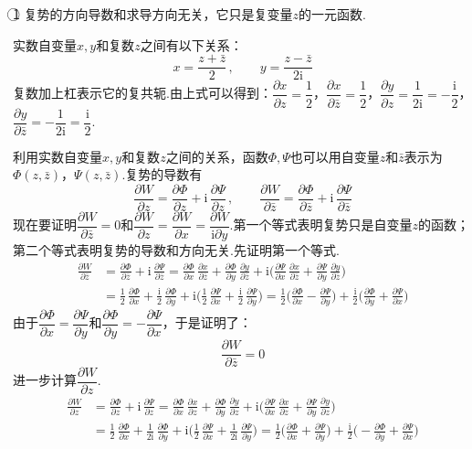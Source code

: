 \textcircled{1} 复势的方向导数和求导方向无关，它只是复变量$z$的一元函数.

实数自变量$x,y$和复数$z$之间有以下关系：
\[
x=\frac{z+\bar{z}}{2}\,,\qquad y=\frac{z-\bar{z}}{2\mathrm{i}}
\]
复数加上杠表示它的复共轭.由上式可以得到：$\dfrac{\partial x}{\partial z}=\dfrac{1}{2}$，$\dfrac{\partial x}{\partial\bar{z}}=\dfrac{1}{2}$，$\dfrac{\partial y}{\partial z}=\dfrac{1}{2\mathrm{i}}=-\dfrac{\mathrm{i}}{2}$，$\dfrac{\partial y}{\partial\bar{z}}=-\dfrac{1}{2\mathrm{i}}=\dfrac{\mathrm{i}}{2}$.

利用实数自变量$x,y$和复数$z$之间的关系，函数$\Phi,\Psi$也可以用自变量$z$和$\bar{z}$表示为$\Phi(z,\bar{z})$，$\Psi(z,\bar{z})$.复势的导数有
\[
\frac{\partial W}{\partial z}=\frac{\partial\Phi}{\partial z}+\mathrm{i}\,\frac{\partial\Psi}{\partial z}\,,\qquad \frac{\partial W}{\partial\bar{z}}=\frac{\partial\Phi}{\partial\bar{z}}+\mathrm{i}\,\frac{\partial\Psi}{\partial\bar{z}}
\]
现在要证明$\dfrac{\partial W}{\partial\bar{z}}=0$和$\dfrac{\partial W}{\partial z}=\dfrac{\partial W}{\partial x}=\dfrac{\partial W}{\mathrm{i}\partial y}$.第一个等式表明复势只是自变量$z$的函数；第二个等式表明复势的导数和方向无关.先证明第一个等式.
\begin{align*}
\frac{\partial W}{\partial\bar{z}}&=\frac{\partial\Phi}{\partial\bar{z}}+\mathrm{i}\,\frac{\partial\Psi}{\partial\bar{z}}=\frac{\partial\Phi}{\partial x}\,\frac{\partial x}{\partial\bar{z}}+\frac{\partial\Phi}{\partial y}\,\frac{\partial y}{\partial\bar{z}}+\mathrm{i}\Big(\frac{\partial\Psi}{\partial x}\,\frac{\partial x}{\partial\bar{z}}+\frac{\partial\Psi}{\partial y}\,\frac{\partial y}{\partial\bar{z}}\Big)\\
&=\frac{1}{2}\,\frac{\partial\Phi}{\partial x}+\frac{\mathrm{i}}{2}\,\frac{\partial\Phi}{\partial y}+\mathrm{i}\Big(\frac{1}{2}\,\frac{\partial\Psi}{\partial x}+\frac{\mathrm{i}}{2}\,\frac{\partial\Psi}{\partial y}\Big)=\frac{1}{2}\Big(\frac{\partial\Phi}{\partial x}-\frac{\partial\Psi}{\partial y}\Big)+\frac{\mathrm{i}}{2}\Big(\frac{\partial\Phi}{\partial y}+\frac{\partial\Psi}{\partial x}\Big)
\end{align*}
由于$\dfrac{\partial\Phi}{\partial x}=\dfrac{\partial\Psi}{\partial y}$和$\dfrac{\partial\Phi}{\partial y}=-\dfrac{\partial\Psi}{\partial x}$，于是证明了：
\[
\frac{\partial W}{\partial\bar{z}}=0
\]
进一步计算$\dfrac{\partial W}{\partial z}$.
\begin{align*}
\frac{\partial W}{\partial z}&=\frac{\partial\Phi}{\partial z}+\mathrm{i}\,\frac{\partial\Psi}{\partial z}=\frac{\partial\Phi}{\partial x}\,\frac{\partial x}{\partial z}+\frac{\partial\Phi}{\partial y}\,\frac{\partial y}{\partial z}+\mathrm{i}\Big(\frac{\partial\Psi}{\partial x}\,\frac{\partial x}{\partial z}+\frac{\partial\Psi}{\partial y}\,\frac{\partial y}{\partial z}\Big)\\
&=\frac{1}{2}\,\frac{\partial\Phi}{\partial x}+\frac{1}{2\mathrm{i}}\,\frac{\partial\Phi}{\partial y}+\mathrm{i}\Big(\frac{1}{2}\,\frac{\partial\Psi}{\partial x}+\frac{1}{2\mathrm{i}}\,\frac{\partial\Psi}{\partial y}\Big)=\frac{1}{2}\Big(\frac{\partial\Phi}{\partial x}+\frac{\partial\Psi}{\partial y}\Big)+\frac{\mathrm{i}}{2}\Big(-\frac{\partial\Phi}{\partial y}+\frac{\partial\Psi}{\partial x}\Big)
\end{align*}
